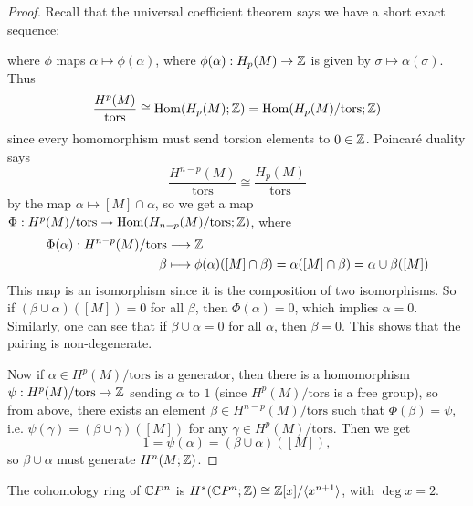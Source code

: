 \begin{proof}
  Recall that the universal coefficient
  theorem says we have a short exact sequence:
  \begin{center}
  \end{center}
  where $\phi$ maps $\alpha \mapsto \phi(\alpha)$,
  where $\phi(\alpha) : H_p(M) \to \mathbb{Z}$ is
  given by $\sigma \mapsto \alpha(\sigma)$.
  Thus
  \[
    \frac{H^p(M)}{\mathrm{tors}} \cong
    \operatorname{Hom}(H_p(M); \mathbb{Z})
    = \operatorname{Hom}(H_p(M) / \mathrm{tors}; \mathbb{Z})
  \]
  since every homomorphism must send torsion
  elements to $0 \in \mathbb{Z}$. Poincar\'e
  duality says
  \[
    \frac{H^{n - p}(M)}{\mathrm{tors}} \cong
    \frac{H_p(M)}{\mathrm{tors}}
  \]
  by the map $\alpha \mapsto [M] \cap \alpha$,
  so we get a map $\Phi : H^p(M) / \mathrm{tors} \to \operatorname{Hom}(H_{n - p}(M) / \mathrm{tors}; \mathbb{Z})$,
  where
  \begin{align*}
    \Phi(\alpha) : H^{n - p}(M) / \mathrm{tors}
    &\longrightarrow \mathbb{Z} \\
    \beta &\longmapsto \phi(\alpha)([M] \cap \beta)
    = \alpha([M] \cap \beta)
    = \alpha \cup \beta([M])
  \end{align*}
  This map is an isomorphism since it
  is the composition of two
  isomorphisms. So if
  $(\beta \cup \alpha)([M]) = 0$ for all
  $\beta$, then $\Phi(\alpha) = 0$, which
  implies $\alpha = 0$. Similarly, one can
  see that if
  $\beta \cup \alpha = 0$ for all $\alpha$, then
  $\beta = 0$. This shows that the pairing
  is non-degenerate.

  Now if $\alpha \in H^p(M) / \mathrm{tors}$
  is a generator, then there is a homomorphism
  $\psi : H^p(M) / \mathrm{tors} \to \mathbb{Z}$
  sending $\alpha$ to $1$ (since
  $H^p(M) / \mathrm{tors}$ is a free group), so
  from above, there exists an element
  $\beta \in H^{n - p}(M) / \mathrm{tors}$ such
  that $\Phi(\beta) = \psi$, i.e. $\psi(\gamma) = (\beta \cup \gamma)([M])$ for any $\gamma \in H^p(M) / \mathrm{tors}$. Then we get
  \[
    1 = \psi(\alpha) = (\beta \cup \alpha)([M]),
  \]
  so $\beta \cup \alpha$ must generate
  $H^n(M; \mathbb{Z})$.
\end{proof}

\begin{corollary}
  The cohomology ring of $\mathbb{C} P^n$ is
  $H^*(\mathbb{C} P^n; \mathbb{Z}) \cong \mathbb{Z}[x] / \langle x^{n + 1} \rangle$,
  with $\deg x = 2$.
\end{corollary}

